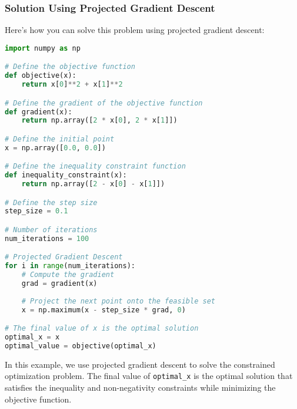 \documentclass[a4paper]{article}
\begin{document}
\subsubsection{Solution Using Projected Gradient Descent}

Here's how you can solve this problem using projected gradient descent:

\begin{lstlisting}[language=Python]
import numpy as np

# Define the objective function
def objective(x):
    return x[0]**2 + x[1]**2

# Define the gradient of the objective function
def gradient(x):
    return np.array([2 * x[0], 2 * x[1]])

# Define the initial point
x = np.array([0.0, 0.0])

# Define the inequality constraint function
def inequality_constraint(x):
    return np.array([2 - x[0] - x[1]])

# Define the step size
step_size = 0.1

# Number of iterations
num_iterations = 100

# Projected Gradient Descent
for i in range(num_iterations):
    # Compute the gradient
    grad = gradient(x)
    
    # Project the next point onto the feasible set
    x = np.maximum(x - step_size * grad, 0)

# The final value of x is the optimal solution
optimal_x = x
optimal_value = objective(optimal_x)
\end{lstlisting}

In this example, we use projected gradient descent to solve the constrained optimization problem. The final value of \texttt{optimal\_x} is the optimal solution that satisfies the inequality and non-negativity constraints while minimizing the objective function.
\end{document}
